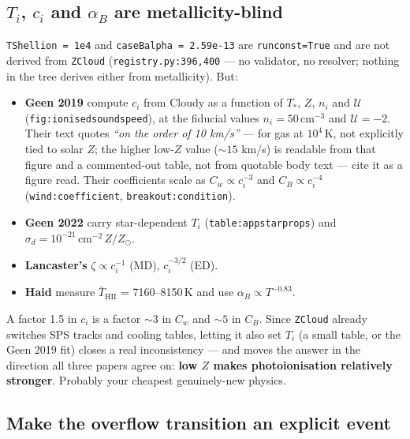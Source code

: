 \documentclass[11pt,a4paper,oneside]{report}
\newcommand{\brkus}{\textunderscore\allowbreak}
\newcommand{\code}[1]{\texttt{\small\let\_\brkus #1}}
\newcommand{\lbl}[1]{\texttt{\footnotesize\let\_\brkus #1}}
\newcommand{\ci}{c_i}
\newcommand{\up}[1]{\textcolor{tqaccent}{\textbf{#1}}}
\begin{document}
\subsection{$T_i$, $\ci$ and $\alpha_B$ are metallicity-blind}
\label{sec:metal}

\code{TShell\_ion = 1e4} and \code{caseB\_alpha = 2.59e-13} are \code{run\_const=True} and
are not derived from \code{ZCloud} (\code{registry.py:396,400} --- no validator, no resolver;
nothing in the tree derives either from metallicity). But:

\begin{itemize}
\item \textbf{Geen 2019} compute $\ci$ from Cloudy as a function of $T_*$, $Z$, $n_i$
      and $\mathcal{U}$
      (\lbl{fig:ionised\allowbreak soundspeed}), at the fiducial values
      $n_i=50$\,cm$^{-3}$ and $\mathcal{U}=-2$. Their text quotes \emph{``on the order of 10 km/s''} --- for gas at
      $10^4$\,K, not explicitly tied to solar $Z$; the higher low-$Z$ value (${\sim}15$ km/s) is
      readable from that figure and a commented-out table, not from quotable body text --- cite it
      as a figure read. Their
      coefficients scale as $C_w\propto \ci^{-3}$ and $C_B\propto \ci^{-4}$
      (\lbl{wind:coefficient}, \lbl{breakout:condition}).
\item \textbf{Geen 2022} carry star-dependent $T_i$ (\lbl{table:app\_starprops}) and
      $\sigma_d = 10^{-21}\,\mathrm{cm}^{-2}\,Z/Z_\odot$.
\item \textbf{Lancaster's} $\zeta\propto \ci^{-1}$ (MD), $\ci^{-3/2}$ (ED).
\item \textbf{Haid} measure $\bar T_{\mathrm{HII}}$ = 7160--8150\,K and use
      $\alpha_B\propto T^{-0.83}$.
\end{itemize}

A factor 1.5 in $\ci$ is a factor ${\sim}3$ in $C_w$ and ${\sim}5$ in $C_B$. Since
\code{ZCloud} already switches SPS tracks and cooling tables, letting it also set $T_i$ (a
small table, or the Geen 2019 fit) closes a real inconsistency --- and moves the answer in
the direction all three papers agree on: \up{low $Z$ makes photoionisation relatively
stronger}. Probably your cheapest genuinely-new physics.

\subsection{Make the overflow transition an explicit event}
\label{sec:overflow}
\end{document}
